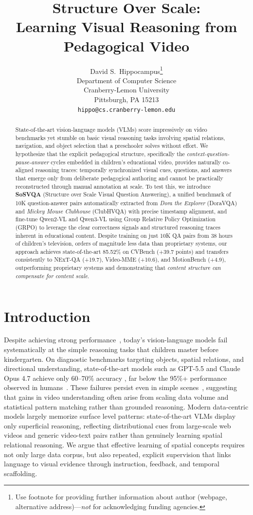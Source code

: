 \documentclass{article}
\title{Structure Over Scale:\\Learning Visual Reasoning from Pedagogical Video}
\author{%
  David S.~Hippocampus\thanks{Use footnote for providing further information
    about author (webpage, alternative address)---\emph{not} for acknowledging
    funding agencies.} \\
  Department of Computer Science\\
  Cranberry-Lemon University\\
  Pittsburgh, PA 15213 \\
  \texttt{hippo@cs.cranberry-lemon.edu} \\
}
\begin{document}
\maketitle


\begin{abstract}
State-of-the-art vision-language models (VLMs) score impressively on video
benchmarks yet stumble on basic visual reasoning tasks involving spatial
relations, navigation, and object selection that a preschooler solves
without effort. We hypothesize that the explicit pedagogical structure,
specifically the \textit{context-question-pause-answer} cycles embedded in
children's educational video, provides naturally co-aligned reasoning
traces: temporally synchronized visual cues, questions, and answers that
emerge only from deliberate pedagogical authoring and cannot be practically
reconstructed through manual annotation at scale. To test this, we introduce
\textbf{SoSVQA} (Structure over Scale Visual Question Answering), a unified
benchmark of 10K question-answer pairs automatically extracted from
\textit{Dora the Explorer} (DoraVQA) and \textit{Mickey Mouse Clubhouse}
(ClubHVQA) with precise timestamp alignment, and fine-tune Qwen2-VL and
Qwen3-VL using Group Relative Policy Optimization (GRPO) to leverage the
clear correctness signals and structured reasoning traces inherent in
educational content. Despite training on just 10K QA pairs from 38 hours
of children's television, orders of magnitude less data than proprietary
systems, our approach achieves state-of-the-art 85.52\% on CVBench
(+39.7 points) and transfers consistently to NExT-QA (+19.7), Video-MME
(+10.6), and MotionBench (+4.9), outperforming proprietary systems and
demonstrating that \textit{content structure can compensate for
content scale}.
\end{abstract}



\section{Introduction}

Despite achieving strong performance~\cite{xu2017videoquestion, xiao2021next}, today's vision-language models fail systematically at the simple reasoning tasks that children master before kindergarten. On diagnostic benchmarks targeting objects, spatial relations, and directional understanding, state-of-the-art models such as GPT-5.5 and Claude Opus 4.7 achieve only 60--70\% accuracy \cite{llmstats2026}, far below the 95\%+ performance observed in humans~\cite{fu2024blink}. These failures persist even in simple scenes~\cite{tong2024eyes}, suggesting that gains in video understanding often arise from scaling data volume and statistical pattern matching rather than grounded reasoning. Modern data-centric models largely memorize surface level patterns: state-of-the-art VLMs display only superficial reasoning, reflecting distributional cues from large-scale web videos and generic video-text pairs rather than genuinely learning spatial relational reasoning. We argue that effective learning of spatial concepts requires not only large data corpus, but also repeated, explicit supervision that links language to visual evidence through instruction, feedback, and temporal scaffolding.  
\end{document}
